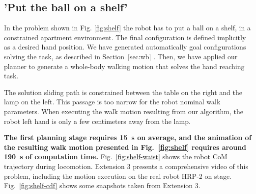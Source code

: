 \documentclass{article}
\begin{document}
\subsection{'Put the ball on a shelf'}
\label{sec:shelf}

In the problem shown in Fig. \ref{fig:shelf} the robot has to put a ball on a
shelf, in a constrained apartment environment. The final configuration is defined 
implicitly as a desired hand position. We have generated automatically goal configurations 
solving the task, as described in Section~\ref{sec:wb} . Then, we have
applied our planner to generate a whole-body walking motion that solves the hand reaching
task. 

The solution sliding path is constrained between the table on the right and the lamp
on the left. This passage is too narrow for the robot nominal walk parameters. 
When executing the walk motion resulting from our algorithm, the robot left hand
is only a few centimeters away from the lamp.

\textbf{The first planning stage requires 15~s on average, and the
  animation of the resulting walk motion presented in
  Fig.~\ref{fig:shelf} requires around 190~s of computation time.}
Fig.~\ref{fig:shelf-waist} shows the robot CoM trajectory during
locomotion. Extension 3 presents a comprehensive video of this
problem, including the motion execution on the real robot HRP-2 on
stage. Fig.~\ref{fig:shelf-cdf} shows some snapshots taken from
Extension 3.
\end{document}
